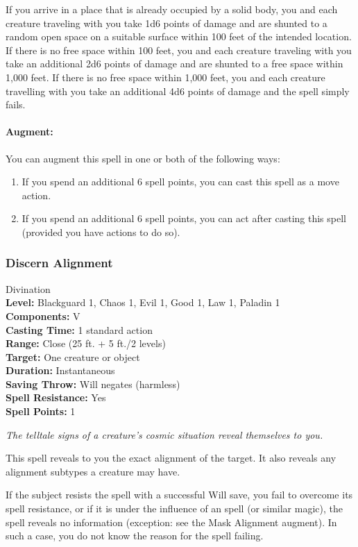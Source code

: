 If you arrive in a place that is already occupied by a solid body, 
you and each creature traveling with you take 1d6 points of damage and 
are shunted to a random open space on a suitable surface within 100 feet of the intended location.
If there is no free space within 100 feet, you and each creature traveling with you take an additional 
2d6 points of damage and are shunted to a free space within 1,000 feet. 
If there is no free space within 1,000 feet, 
you and each creature travelling with you take an additional 4d6 points of damage and the spell simply fails.

\paragraph{Augment:} You can augment this spell in one or both of the following ways:
\begin{enumerate}
 \item If you spend an additional 6 spell points, you can cast this spell as a move action.
 \item If you spend an additional 6 spell points, you can act after casting this spell (provided you have actions to do so).
\end{enumerate}
\subsubsection{Discern Alignment}
\label{Spell:DiscernAlignment}
Divination
\\ \textbf{Level:} Blackguard 1, Chaos 1, Evil 1, Good 1, Law 1, Paladin 1
\\ \textbf{Components:} V
\\ \textbf{Casting Time:} 1 standard action
\\ \textbf{Range:} Close (25 ft. + 5 ft./2 levels)
\\ \textbf{Target:} One creature or object
\\ \textbf{Duration:} Instantaneous
\\ \textbf{Saving Throw:} Will negates (harmless)
\\ \textbf{Spell Resistance:} Yes
\\ \textbf{Spell Points:} 1

\emph{The telltale signs of a creature's cosmic situation reveal themselves to you.}

This spell reveals to you the exact alignment of the target.
It also reveals any alignment subtypes a creature may have.

If the subject resists the spell with a successful Will save, you fail to overcome its spell resistance, 
or if it is under the influence of an  spell (or similar magic),
the spell reveals no information (exception: see the Mask Alignment augment). 
In such a case, you do not know the reason for the spell failing.

